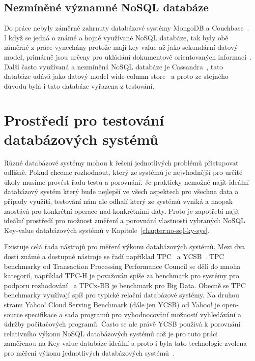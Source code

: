 \documentclass[czech,master,dept460,male,csharp,cpdeclaration]{diploma}
\begin{document}
	\section {Nezmíněné významné NoSQL databáze}
	
		Do práce nebyly záměrně zahrnuty databázové systémy MongoDB a Couchbase~\cite{mongodb,couchbase}. I když se jedná o známé a hojně využívané NoSQL databáze, tak byly obě záměrné z práce vynechány protože mají key-value až jako sekundární datový model, primárně jsou určeny pro ukládání dokumentově orientovaných informací~\cite{documentdb}. Další často využívaná a nezmíněná NoSQL databáze je Cassandra~\cite{cassandra}, tato databáze udává jako datový model wide-column store~\cite{widecolumnstore} a proto ze stejného důvodu byla i tato databáze vyřazena z testování.
	
	\chapter{Prostředí pro testování databázových systémů}
	
	Různé databázové systémy mohou k řešení jednotlivých problémů přistupovat odlišně. Pokud chceme rozhodnout, který ze systémů je nejvhodnější pro určité úkoly musíme provést řadu testů a porovnání. Je prakticky nemožné najít ideální databázový systém který bude nejlepší ve všech aspektech pro všechna data a případy využití, testování nám ale odhalí který ze systémů vyniká a naopak zaostává pro konkrétní operace nad konkrétními daty. Proto je zapotřebí najít ideální prostředí pro možnost změření a porovnání vlastností vybraných NoSQL Key-value databázových systémů v Kapitole~\ref{chapter:no-sql-ky-sys}.
	
	Existuje celá řada nástrojů pro měření výkonu databázových systémů. Mezi dva dosti známé a dostupné nástroje se řadí například TPC~\cite{tpc} a YCSB~\cite{ycsb}. TPC benchmarky od Transaction Processing Performance Council se dělí do mnoha kategorií, například TPC-H je považován spíše za benchmark pro systémy pro podporu rozhodování~\cite{dss} a TPCx-BB je benchmark pro Big Data. Obecně se TPC benchmarky využívají spíš pro typické relační databázové systémy. Na druhou stranu Yahoo! Cloud Serving Benchmark (dále jen YCSB) od Yahoo! je open-source specifikace a sada programů pro vyhodnocování možností vyhledávání a údržby počítačových programů. Často se ale právě YCSB používá k porovnání relativního výkonu NoSQL databázových systémů což je pro tuto práci zaměřenou na Key-value databáze ideální a proto i byla tato technologie zvolena pro měření výkonu jednotlivých databázových systémů~\cite{benchmark-pdf-1, benchmark-pdf-2}.
	
\end{document}
